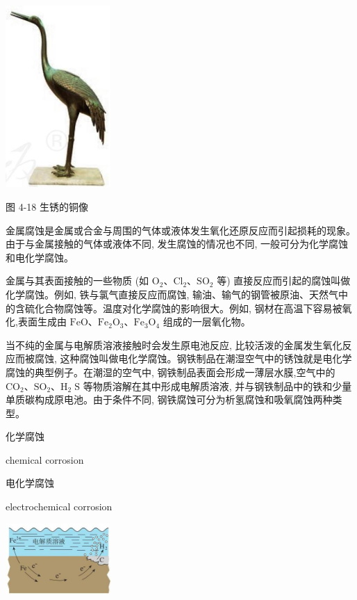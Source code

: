 \documentclass[10pt]{article}
\begin{document}
\begin{center}
\includegraphics[max width=0.3\textwidth]{images/0190da9d-8bfd-732f-bc2c-0b21d0f13b91_116_498635.jpg}
\end{center}

图 4-18 生锈的铜像

金属腐蚀是金属或合金与周围的气体或液体发生氧化还原反应而引起损耗的现象。由于与金属接触的气体或液体不同, 发生腐蚀的情况也不同, 一般可分为化学腐蚀和电化学腐蚀。

金属与其表面接触的一些物质 (如 \({\mathrm{O}}_{2}\text{、}{\mathrm{{Cl}}}_{2}\text{、}{\mathrm{{SO}}}_{2}\) 等) 直接反应而引起的腐蚀叫做化学腐蚀。例如, 铁与氯气直接反应而腐蚀, 输油、输气的钢管被原油、天然气中的含硫化合物腐蚀等。温度对化学腐蚀的影响很大。例如, 钢材在高温下容易被氧化,表面生成由 \(\mathrm{{FeO}}\text{、}{\mathrm{{Fe}}}_{2}{\mathrm{O}}_{3}\text{、}{\mathrm{{Fe}}}_{3}{\mathrm{O}}_{4}\) 组成的一层氧化物。

当不纯的金属与电解质溶液接触时会发生原电池反应, 比较活泼的金属发生氧化反应而被腐蚀, 这种腐蚀叫做电化学腐蚀。钢铁制品在潮湿空气中的锈蚀就是电化学腐蚀的典型例子。在潮湿的空气中, 钢铁制品表面会形成一薄层水膜,空气中的 \({\mathrm{{CO}}}_{2}\text{、}{\mathrm{{SO}}}_{2}\text{、}{\mathrm{H}}_{2}\mathrm{\;S}\) 等物质溶解在其中形成电解质溶液, 并与钢铁制品中的铁和少量单质碳构成原电池。由于条件不同, 钢铁腐蚀可分为析氢腐蚀和吸氧腐蚀两种类型。

\begin{mdframed}

化学腐蚀

chemical corrosion

电化学腐蚀

electrochemical corrosion

\end{mdframed}

\begin{center}
\includegraphics[max width=0.3\textwidth]{images/0190da9d-8bfd-732f-bc2c-0b21d0f13b91_117_492718.jpg}
\end{center}
\end{document}

